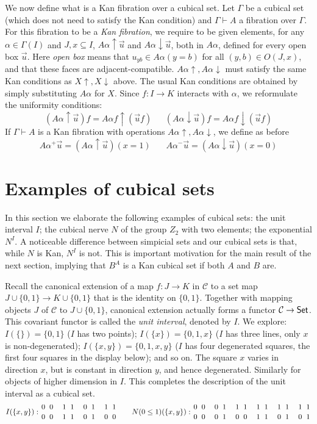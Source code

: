 \documentclass[10pt,a4paper]{article}
\newcommand{\CC}{{\mathcal C}}
\newcommand{\set}[1]{\{#1\}}
\newcommand{\rup}[1]{#1{\uparrow}}
\newcommand{\rdo}[1]{#1{\downarrow}}
\begin{document}
 We now define what is a Kan fibration over a cubical set.
Let $\Gamma$ be a cubical set (which does not need to satisfy the Kan condition)
and $\Gamma\vdash A$ a fibration over $\Gamma$.
For this fibration to be a \emph{Kan fibration}, we require to be given elements,
for any $\alpha\in\Gamma(I)$ and $J,x\subseteq I$,
$\rup{A\alpha} \vec u$  and $\rdo{A\alpha} \vec u$, both in $A\alpha$,
defined for every open box $\vec u$.
Here \emph{open box} means that $u_{yb}\in A\alpha(y=b)$ for all $(y,b)\in O(J,x)$,
and that these faces are adjacent-compatible.
$\rup{A\alpha}, \rdo{A\alpha}$ must satisfy the same Kan conditions as $ \rup{X},\rdo{X}$ above.
The usual Kan conditions are obtained by simply substituting $A\alpha$ for $X$.
Since $f:I\to K$ interacts with $\alpha$, we reformulate the uniformity conditions:
$$
(\rup{A\alpha} \vec u)f = \rup{A\alpha f} (\vec{u}f)~~~~~~~
(\rdo{A\alpha} \vec u)f = \rdo{A\alpha f} (\vec{u}f)
$$
If $\Gamma\vdash A$ is a Kan fibration with operations $\rup{A\alpha},\rdo{A\alpha}$, we define as before
$$
A\alpha^+\vec u = (\rup{A\alpha} \vec u)(x=1)~~~~~~~~
A\alpha^-\vec u = (\rdo{A\alpha} \vec u)(x=0)
$$

\section{Examples of cubical sets}\label{sec:examples}
In this section we elaborate the following examples of cubical sets:
the unit interval $I$;
the cubical nerve $N$ of the group $Z_2$ with two elements;
the exponential $N^I$.
A noticeable difference between simpicial sets and our cubical sets is that,
while $N$ is Kan, $N^I$ is not.
This is important motivation for the main result of the next section,
implying that $B^A$ is a Kan cubical set if both $A$ and $B$ are.

Recall the canonical extension of a map $f:J\to K$ in $\CC$
to a set map $J \cup \set{0,1} \to K\cup \set{0,1}$ that is the identity on $\set{0,1}$.
Together with  mapping objects $J$ of $\CC$ to $J \cup \set{0,1}$,
canonical extension actually forms a functor $\CC\to{\sf Set}$.
This covariant functor is called the \emph{unit interval}, denoted by $I$.
We explore: $I(\set{})=\set{0,1}$ ($I$ has two points);
$I(\set{x})=\set{0,1,x}$ ($I$ has three lines, only $x$ is non-degenerated);
$I(\set{x,y})=\set{0,1,x,y}$ ($I$ has four degenerated squares,
the first four squares in the display below); and so on.
The square $x$ varies in direction $x$,
but is constant in direction $y$, and hence degenerated.
Similarly for objects of higher dimension in $I$.
This completes the description of the unit interval as a cubical set.
\[
\def\olll{{1 \atop 0} ~ {1 \atop 1}}
\def\oool{{0 \atop 0} ~ {1 \atop 0}}
\def\oooo{{0 \atop 0} ~ {0 \atop 0}}
\def\llll{{1 \atop 1} ~ {1 \atop 1}}
\def\olol{{1 \atop 0} ~ {1 \atop 0}}
\def\ooll{{0 \atop 0} ~ {1 \atop 1}}
\def\Fxy{{0 \atop 0} ~ {0 \atop 0}}
\def\Txy{{1 \atop 1} ~ {1 \atop 1}}
\def\Iy{{1 \atop 0} ~ {1 \atop 0}}
\def\Ix{{0 \atop 0} ~ {1 \atop 1}}
I(\set{x,y}):\Fxy\quad\Txy\quad\Ix\quad\Iy\quad\quad
N(0\leq1)(\set{x,y}):\oooo\quad\ooll\quad\olol\quad\llll\quad\olll\quad\olll\]
\end{document}

